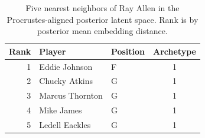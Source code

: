 \begin{table}[htbp]
  \centering\small
  \begin{tabular}{rllc}
    \toprule
    Rank & Player & Position & Archetype \\
    \midrule
    1 & Eddie Johnson & F & 1 \\
    2 & Chucky Atkins & G & 1 \\
    3 & Marcus Thornton & G & 1 \\
    4 & Mike James & G & 1 \\
    5 & Ledell Eackles & G & 1 \\
    \bottomrule
  \end{tabular}
  \caption{Five nearest neighbors of Ray Allen in the Procrustes-aligned posterior latent space. Rank is by posterior mean embedding distance.}
  \label{tab:Ray_Allen_neighbors}
\end{table}

